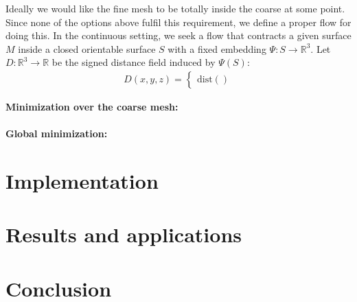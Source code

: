 \documentclass{acmtog}
\begin{document}
Ideally we would like the fine mesh to be totally inside the coarse at some point. Since none of the options above fulfil this requirement, we define a proper flow for doing this. In the continuous setting, we seek a flow that contracts a given surface $M$ inside a closed orientable surface $S$ with a fixed embedding $\Psi: S \to \mathbb{R}^3$. Let $D: \mathbb{R}^3 \to \mathbb{R}$ be the signed distance field induced by $\Psi(S)$: 
\begin{align}
D(x,y,z) = \left\{ \begin{array}{rcl} 
\mathrm{dist}()
\end{array}
\right.
\end{align}

\textbf{Minimization over the coarse mesh:}\\
\\
\textbf{Global minimization:}

\section{Implementation}
\label{sec:implementation}

\section{Results and applications}
\label{sec:results}

\section{Conclusion}
\label{sec:colnclusion}

\begin{acks}
\end{acks}





\end{document}

